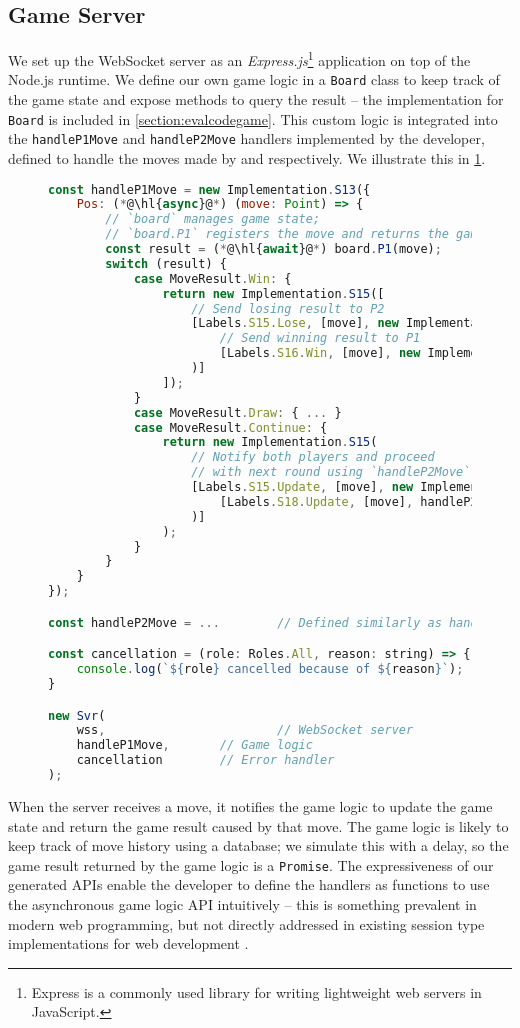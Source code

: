 \subsection{Game Server}
We set up the WebSocket server as an \textit{Express.js}\footnote{
Express is a commonly used library for writing lightweight
web servers in JavaScript.
} \cite{Express} application
on top of the Node.js runtime.
We define our own game logic in a \texttt{Board} class
to keep track of the game state and expose methods 
to query the result -- the implementation for \texttt{Board} is included
in \cref{section:evalcodegame}.
This custom logic is integrated into the 
\texttt{handleP1Move} and \texttt{handleP2Move}
handlers implemented by the developer, defined to
handle the moves made by  and  respectively.
We illustrate this in \cref{lst:gamesvr}.

\begin{figure}[!h]
\begin{lstlisting}[language=javascript,tabsize=2]
const handleP1Move = new Implementation.S13({
	Pos: (*@\hl{async}@*) (move: Point) => {
		// `board` manages game state;
		// `board.P1` registers the move and returns the game result
		const result = (*@\hl{await}@*) board.P1(move);
		switch (result) {
			case MoveResult.Win: {
				return new Implementation.S15([
					// Send losing result to P2
					[Labels.S15.Lose, [move], new Implementation.S16(
						// Send winning result to P1
						[Labels.S16.Win, [move], new Implementation.Terminal()]
					)]
				]);
			}
			case MoveResult.Draw: { ... }
			case MoveResult.Continue: {
				return new Implementation.S15(
					// Notify both players and proceed
					// with next round using `handleP2Move`
					[Labels.S15.Update, [move], new Implementation.S18(
						[Labels.S18.Update, [move], handleP2Move]
					)]
				);	
			}		
		}
	}
});

const handleP2Move = ...		// Defined similarly as handleP1Move

const cancellation = (role: Roles.All, reason: string) => {
	console.log(`${role} cancelled because of ${reason}`);
}

new Svr(
	wss,						// WebSocket server
	handleP1Move,		// Game logic
	cancellation		// Error handler
);
\end{lstlisting}
\label{lst:gamesvr}
\end{figure}

When the server receives a move, it notifies
the game logic to update the game state and return the game
result caused by that move.
The game logic is likely to keep track of move history
using a database; we simulate this with a delay, so 
the game result returned by the game logic is a \texttt{Promise}.
The expressiveness of our generated APIs enable the developer
to define the handlers as  functions
to use the asynchronous game logic API intuitively -- this is something
prevalent in modern web programming, but not directly addressed in existing
session type implementations for web development \cite{PureScript2019,MVU2020}.

